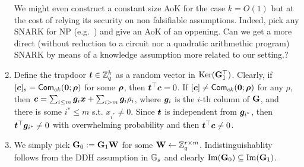 \begin{enumerate}[label=(\alph*)]
We might even construct a constant size AoK for the case $k=O(1)$ but at the cost of relying its security on non falsifiable assumptions. Indeed, pick any SNARK for NP (e.g.~\cite{EC:Groth17}) and give an AoK of an oppening. {\color{red} Can we get a more direct (without reduction to a circuit nor a quadratic arithmethic program) SNARK by means of a knowledge assumption more related to our setting.?}
\item Define the trapdoor ${\boldsymbol{t}}\in\mathbb{Z}_q^k$ as a random vector in $\mathrm{Ker}(\mathbf{{G}}_1^\top)$. 
Clearly, if $[{\boldsymbol{c}}]_s=\mathsf{Com}_{ck}({\boldsymbol{0}};{\boldsymbol{\rho}})$ for some ${\boldsymbol{\rho}}$, then ${\boldsymbol{t}}^\top{\boldsymbol{c}}=0$. If $[{\boldsymbol{c}}]\neq\mathsf{Com}_{ck}({\boldsymbol{0}};{\boldsymbol{\rho}})$ for any $\rho$, then ${\boldsymbol{c}}=\sum_{i\leq m}{\boldsymbol{g}}_i{\boldsymbol{x}}+\sum_{i>m}{\boldsymbol{g}}_i\rho_i$, where ${\boldsymbol{g}}_i$ is the $i$-th column of $\mathbf{{G}}$, and there is some $i^*\leq m$ s.t. $x_{i^*}\neq 0$. Since ${\boldsymbol{t}}$ is independent from ${\boldsymbol{g}}_{i^*}$, then ${\boldsymbol{t}}^\top{\boldsymbol{g}}_{i^*}\neq 0$ with overwhelming probability and then ${\boldsymbol{t}}^\top{\boldsymbol{c}}\neq 0$. 
\item We simply pick $\mathbf{{G}}_0:=\mathbf{{G}}_1\mathbf{{W}}$ for some $\mathbf{{W}}\gets\mathbb{Z}_q^{r\times m}$. Indistinguishablity follows from the DDH assumption in $\mathbb{G}_s$ and clearly $\mathrm{Im}(\mathbf{{G}}_0)\subseteq\mathrm{Im}(\mathbf{{G}}_1)$.
\end{enumerate}

